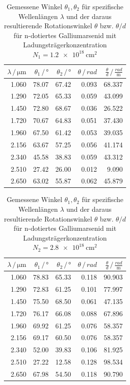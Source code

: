 \begin{table}
    \centering
    \caption{Gemessene Winkel $\theta_1, \theta_2$ für spezifische Wellenlängen $\lambda$ und der daraus resultierende Rotationswinkel $\theta$ bzw. $\theta/d$ für n-dotiertes Galliumarsenid mit Ladungsträgerkonzentration $N_1 = \qty{1.2e18}{\centi\metre^2}$}
    \label{tab:N1}
    \begin{tabular}{r r r r r}
        \toprule
        $\lambda \,/\, \unit{\micro\metre}$ & $\theta_1 \,/\, \unit{\degree}$ & $\theta_2 \,/\, \unit{\degree}$ & $\theta \,/\, \unit{rad}$ & $\frac{\theta}{d} \,/\, \frac{rad}{\unit{\metre}}$ \\
        \midrule
        1.060 & 78.07 & 67.42 & 0.093 & 68.337 \\
        1.290 & 72.05 & 65.33 & 0.059 & 43.099 \\
        1.450 & 72.80 & 68.67 & 0.036 & 26.522 \\
        1.720 & 70.67 & 64.83 & 0.051 & 37.430 \\
        1.960 & 67.50 & 61.42 & 0.053 & 39.035 \\
        2.156 & 63.67 & 57.25 & 0.056 & 41.174 \\
        2.340 & 45.58 & 38.83 & 0.059 & 43.312 \\
        2.510 & 27.42 & 26.00 & 0.012 & 9.090 \\
        2.650 & 63.02 & 55.87 & 0.062 & 45.879 \\
        \bottomrule
    \end{tabular}
\end{table}
\begin{table}
    \centering
    \caption{Gemessene Winkel $\theta_1, \theta_2$ für spezifische Wellenlängen $\lambda$ und der daraus resultierende Rotationswinkel $\theta$ bzw. $\theta/d$ für n-dotiertes Galliumarsenid mit Ladungsträgerkonzentration $N_2 = \qty{2.8e18}{\centi\metre^2}$}
    \label{tab:N2}
    \begin{tabular}{r r r r r}
        \toprule
        $\lambda \,/\, \unit{\micro\metre}$ & $\theta_1 \,/\, \unit{\degree}$ & $\theta_2 \,/\, \unit{\degree}$ & $\theta \,/\, \unit{rad}$ & $\frac{\theta}{d} \,/\, \frac{rad}{\unit{\metre}}$ \\
        \midrule
        1.060 & 78.83 & 65.33 & 0.118 & 90.903 \\
        1.290 & 72.83 & 61.25 & 0.101 & 77.997 \\
        1.450 & 75.50 & 68.50 & 0.061 & 47.135 \\
        1.720 & 76.17 & 66.08 & 0.088 & 67.896 \\
        1.960 & 69.92 & 61.25 & 0.076 & 58.357 \\
        2.156 & 69.17 & 60.50 & 0.076 & 58.357 \\
        2.340 & 52.00 & 39.83 & 0.106 & 81.925 \\
        2.510 & 27.22 & 12.58 & 0.128 & 98.534 \\
        2.650 & 67.98 & 54.50 & 0.118 & 90.790 \\      
        \bottomrule
    \end{tabular}
\end{table}
